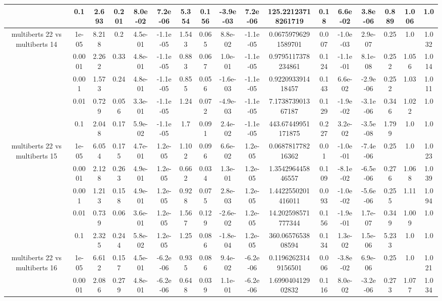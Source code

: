 \begin{tabular}{|c|c|c|c|c|c|c|c|c|c|c|c|c|c|c|c|c|}
 & 0.1 & 2.693 & 0.201 & 8.0e-02 & 7.2e-06 & 5.354 & 0.156 & -3.9e-03 & 7.2e-06 & 125.22123718261719 & 0.18 & 6.6e-02 & 3.8e-06 & 0.889 & 1.006 & 1.0 \\
\hline
\multirow{5}{*}{multiberts 22 vs multiberts 14} & 1e-05 & 8.218 & 0.2 & 4.5e-01 & -1.1e-05 & 1.543 & 0.065 & 8.8e-02 & -1.1e-05 & 0.06759796291589701 & 0.007 & -1.0e-03 & 2.9e-07 & 0.25 & 1.0 & 1.032 \\
 & 0.0001 & 2.262 & 0.33 & 4.8e-01 & -1.1e-05 & 0.883 & 0.067 & 1.0e-01 & -1.1e-05 & 0.9795117378234861 & 0.124 & -1.1e-01 & 8.1e-08 & 0.252 & 1.056 & 1.014 \\
 & 0.001 & 1.573 & 0.24 & 4.8e-01 & -1.1e-05 & 0.855 & 0.056 & -1.6e-03 & -1.1e-05 & 0.922093391418457 & 0.143 & 6.6e-02 & -2.9e-06 & 0.252 & 1.03 & 1.011 \\
 & 0.01 & 0.729 & 0.056 & 3.3e-01 & -1.1e-05 & 1.24 & 0.072 & -4.9e-03 & -1.1e-05 & 7.173873901367187 & 0.129 & -1.9e-02 & -3.1e-06 & 0.346 & 1.022 & 1.0 \\
 & 0.1 & 2.048 & 0.17 & 5.9e-02 & -1.1e-05 & 1.7 & 0.091 & 2.4e-02 & -1.1e-05 & 443.67449951171875 & 0.227 & 3.2e-02 & -3.5e-08 & 1.799 & 1.0 & 1.0 \\
\hline
\multirow{5}{*}{multiberts 22 vs multiberts 15} & 1e-05 & 6.054 & 0.175 & 4.7e-01 & 1.2e-05 & 1.102 & 0.096 & 6.6e-02 & 1.2e-05 & 0.068781778216362 & 0.01 & -1.0e-01 & -7.4e-06 & 0.25 & 1.0 & 1.023 \\
 & 0.0001 & 2.128 & 0.263 & 4.9e-01 & 1.2e-05 & 0.662 & 0.034 & 1.3e-01 & 1.2e-05 & 1.354296445846557 & 0.109 & -8.1e-02 & -6.5e-06 & 0.276 & 1.068 & 1.039 \\
 & 0.001 & 1.213 & 0.158 & 4.9e-01 & 1.2e-05 & 0.928 & 0.075 & 2.8e-03 & 1.2e-05 & 1.4422550201416011 & 0.093 & -1.0e-02 & -5.6e-06 & 0.255 & 1.11 & 1.094 \\
 & 0.01 & 0.739 & 0.06 & 3.6e-01 & 1.2e-05 & 1.567 & 0.129 & -2.6e-02 & 1.2e-05 & 14.202598571777344 & 0.156 & -1.9e-01 & 1.7e-07 & 0.349 & 1.009 & 1.0 \\
 & 0.1 & 2.325 & 0.244 & 5.8e-02 & 1.2e-05 & 1.25 & 0.086 & -1.8e-04 & 1.2e-05 & 360.0657653808594 & 0.134 & 1.3e-02 & 1.5e-06 & 5.233 & 1.0 & 1.0 \\
\hline
\multirow{5}{*}{multiberts 22 vs multiberts 16} & 1e-05 & 6.612 & 0.157 & 4.5e-01 & -6.2e-06 & 0.935 & 0.086 & 9.4e-02 & -6.2e-06 & 0.11962623149156501 & 0.006 & -3.8e-02 & 6.9e-06 & 0.25 & 1.0 & 1.021 \\
 & 0.0001 & 2.086 & 0.279 & 4.8e-01 & -6.2e-06 & 0.648 & 0.039 & 1.1e-01 & -6.2e-06 & 1.699040412902832 & 0.116 & 8.0e-02 & -3.2e-06 & 0.273 & 1.077 & 1.034 \\

\end{tabular}

